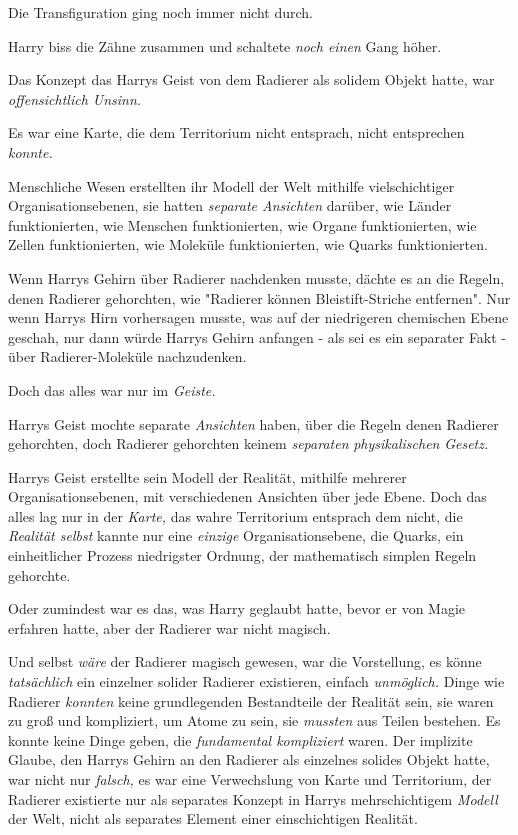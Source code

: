 {Die Transfiguration ging noch immer nicht durch.

Harry biss die Zähne zusammen und schaltete \emph{noch einen} Gang höher.

Das Konzept das Harrys Geist von dem Radierer als solidem Objekt hatte, war \emph{offensichtlich Unsinn.}

Es war eine Karte, die dem Territorium nicht entsprach, nicht entsprechen \emph{konnte.}

Menschliche Wesen erstellten ihr Modell der Welt mithilfe vielschichtiger Organisationsebenen, sie hatten \emph{separate Ansichten} darüber, wie Länder funktionierten, wie Menschen funktionierten, wie Organe funktionierten, wie Zellen funktionierten, wie Moleküle funktionierten, wie Quarks funktionierten.

Wenn Harrys Gehirn über Radierer nachdenken musste, dächte es an die Regeln, denen Radierer gehorchten, wie "Radierer können Bleistift-Striche entfernen". Nur wenn Harrys Hirn vorhersagen musste, was auf der niedrigeren chemischen Ebene geschah, nur dann würde Harrys Gehirn anfangen - als sei es ein separater Fakt - über Radierer-Moleküle nachzudenken.

Doch das alles war nur im \emph{Geiste.}

Harrys Geist mochte separate \emph{Ansichten} haben, über die Regeln denen Radierer gehorchten, doch Radierer gehorchten keinem \emph{separaten} \emph{physikalischen} \emph{Gesetz.}

Harrys Geist erstellte sein Modell der Realität, mithilfe mehrerer Organisationsebenen, mit verschiedenen Ansichten über jede Ebene. Doch das alles lag nur in der \emph{Karte,} das wahre Territorium entsprach dem nicht, die \emph{Realität selbst} kannte nur eine \emph{einzige} Organisationsebene, die Quarks, ein einheitlicher Prozess niedrigster Ordnung, der mathematisch simplen Regeln gehorchte.

Oder zumindest war es das, was Harry geglaubt hatte, bevor er von Magie erfahren hatte, aber der Radierer war nicht magisch.

Und selbst \emph{wäre} der Radierer magisch gewesen, war die Vorstellung, es könne \emph{tatsächlich} ein einzelner solider Radierer existieren, einfach \emph{unmöglich.} Dinge wie Radierer \emph{konnten} keine grundlegenden Bestandteile der Realität sein, sie waren zu groß und kompliziert, um Atome zu sein, sie \emph{mussten} aus Teilen bestehen. Es konnte keine Dinge geben, die \emph{fundamental kompliziert} waren. Der implizite Glaube, den Harrys Gehirn an den Radierer als einzelnes solides Objekt hatte, war nicht nur \emph{falsch,} es war eine Verwechslung von Karte und Territorium, der Radierer existierte nur als separates Konzept in Harrys mehrschichtigem \emph{Modell} der Welt, nicht als separates Element einer einschichtigen Realität.

}
